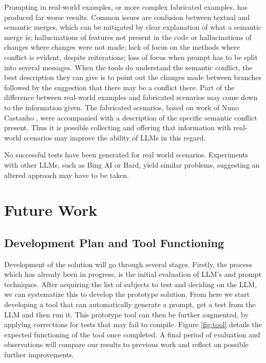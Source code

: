 Prompting in real-world examples, or more complex fabricated examples, has produced far worse results. Common issues are confusion between textual and semantic merges, which can be mitigated by clear explanation of what a semantic merge is; hallucinations of features not present in the code or hallucinations of changes where changes were not made; lack of focus on the methods where conflict is evident, despite reiterations; loss of focus when prompt has to be split into several messages. When the tools do understand the semantic conflict, the best description they can give is to point out the changes made between branches followed by the suggestion that there may be a conflict there.
Part of the difference between real-world examples and fabricated scenarios may come down to the information given. The fabricated scenarios, based on work of Nuno Castanho \cite{kn:nuno}, were accompanied with a description of the specific semantic conflict present. Thus it is possible collecting and offering that information with real-world scenarios may improve the ability of LLMs in this regard.

No successful tests have been generated for real world scenarios.
Experiments with other LLMs, such as Bing AI or Bard, yield similar problems, suggesting an altered approach may have to be taken.



\section{Future Work}

\subsection{Development Plan and Tool Functioning}

Development of the solution will go through several stages. Firstly, the process which has already been in progress, is the initial evaluation of LLM's and prompt techniques. After acquiring the list of subjects to test and deciding on the LLM, we can systematize this to develop the prototype solution. From here we start developing a tool that can automatically generate a prompt, get a test from the LLM and then run it. This prototype tool can then be further augmented, by applying corrections for tests that may fail to compile. Figure \ref{fig:tool} details the expected functioning of the tool once completed. A final period of evaluation and observations will compare our results to previous work and reflect on possible further improvements.

